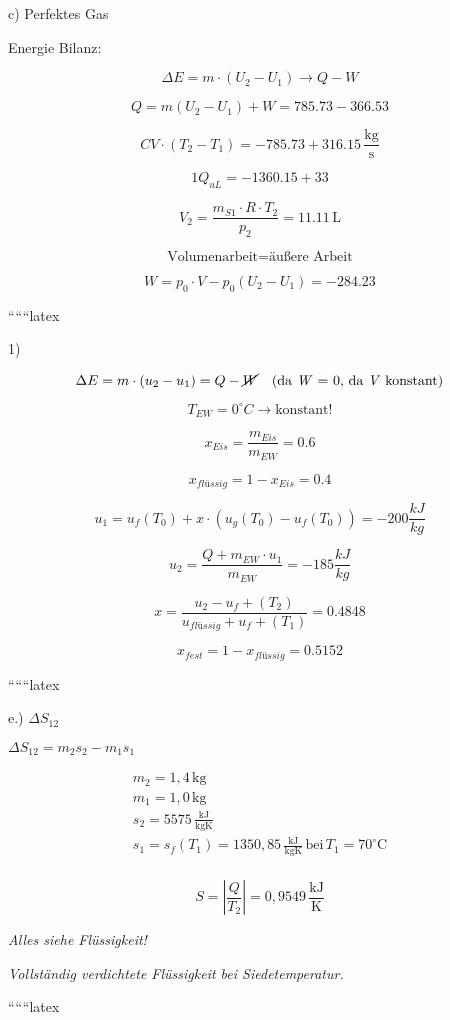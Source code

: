 c) Perfektes Gas

Energie Bilanz:

\[
\Delta E = m \cdot (U_2 - U_1) \rightarrow Q - W
\]

\[
Q = m (U_2 - U_1) + W = 785.73 - 366.53
\]

\[
CV \cdot (T_2 - T_1) = -785.73 + 316.15 \, \frac{\text{kg}}{\text{s}}
\]

\[
1Q_{uL} = -1360.15 + 33
\]

\[
V_2 = \frac{m_{S1} \cdot R \cdot T_2}{p_2} = 11.11 \, \text{L}
\]

\[
\text{Volumenarbeit} = \text{äußere Arbeit}
\]

\[
W = p_0 \cdot V - p_0 (U_2 - U_1) = -284.23
\]

``````latex


1)  \rightarrow {}


\[
\Delta E = m \cdot (u_2 - u_1) = Q - \cancel{W} \quad \text{(da \textit{W} = 0, da \textit{V} konstant)}
\]

\[
T_{EW} = 0^\circ C \rightarrow \text{konstant!}
\]

\[
x_{Eis} = \frac{m_{Eis}}{m_{EW}} = 0.6
\]

\[
x_{flüssig} = 1 - x_{Eis} = 0.4
\]

\[
u_1 = u_f(T_0) + x \cdot (u_g(T_0) - u_f(T_0)) = -200 \frac{kJ}{kg}
\]

\[
u_2 = \frac{Q + m_{EW} \cdot u_1}{m_{EW}} = -185 \frac{kJ}{kg}
\]

\[
x = \frac{u_2 - u_f + (T_2)}{u_{flüssig} + u_f + (T_1)} = 0.4848
\]

\[
x_{fest} = 1 - x_{flüssig} = 0.5152
\]

``````latex


e.) \(\Delta S_{12}\)

\(\Delta S_{12} = m_2 s_2 - m_1 s_1\)

\[
\begin{array}{c}
m_2 = 1,4 \, \text{kg} \\
m_1 = 1,0 \, \text{kg} \\
s_2 = 5575 \, \frac{\text{kJ}}{\text{kgK}} \\
s_1 = s_f(T_1) = 1350,85 \, \frac{\text{kJ}}{\text{kgK}} \, \text{bei} \, T_1 = 70^\circ \text{C} \\
\end{array}
\]

\[
S = \left| \frac{Q}{T_2} \right| = 0,9549 \, \frac{\text{kJ}}{\text{K}}
\]

\textit{Alles siehe Flüssigkeit!}

\textit{Vollständig verdichtete Flüssigkeit bei Siedetemperatur.}

``````latex